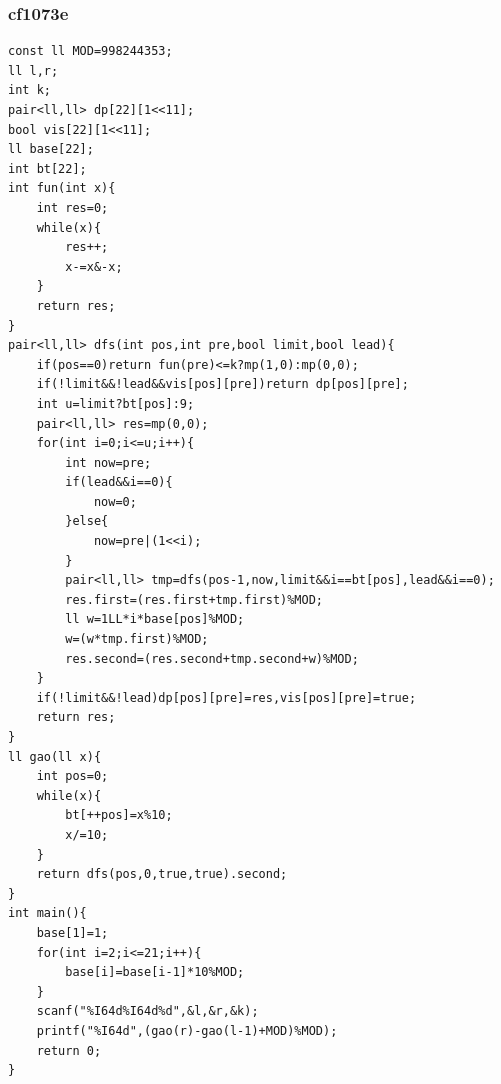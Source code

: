 \documentclass[twoside]{article}
\begin{document}
\subsubsection{cf1073e}
\begin{lstlisting}
const ll MOD=998244353;
ll l,r;
int k;
pair<ll,ll> dp[22][1<<11];
bool vis[22][1<<11];
ll base[22];
int bt[22];
int fun(int x){
    int res=0;
    while(x){
        res++;
        x-=x&-x;
    }
    return res;
}
pair<ll,ll> dfs(int pos,int pre,bool limit,bool lead){
    if(pos==0)return fun(pre)<=k?mp(1,0):mp(0,0);
    if(!limit&&!lead&&vis[pos][pre])return dp[pos][pre];
    int u=limit?bt[pos]:9;
    pair<ll,ll> res=mp(0,0);
    for(int i=0;i<=u;i++){
        int now=pre;
        if(lead&&i==0){
            now=0;
        }else{
            now=pre|(1<<i);
        }
        pair<ll,ll> tmp=dfs(pos-1,now,limit&&i==bt[pos],lead&&i==0);
        res.first=(res.first+tmp.first)%MOD;
        ll w=1LL*i*base[pos]%MOD;
        w=(w*tmp.first)%MOD;
        res.second=(res.second+tmp.second+w)%MOD;
    }
    if(!limit&&!lead)dp[pos][pre]=res,vis[pos][pre]=true;
    return res;
}
ll gao(ll x){
    int pos=0;
    while(x){
        bt[++pos]=x%10;
        x/=10;
    }
    return dfs(pos,0,true,true).second;
}
int main(){
    base[1]=1;
    for(int i=2;i<=21;i++){
        base[i]=base[i-1]*10%MOD;
    }
    scanf("%I64d%I64d%d",&l,&r,&k);
    printf("%I64d",(gao(r)-gao(l-1)+MOD)%MOD);
    return 0;
}
\end{lstlisting}
\end{document}

